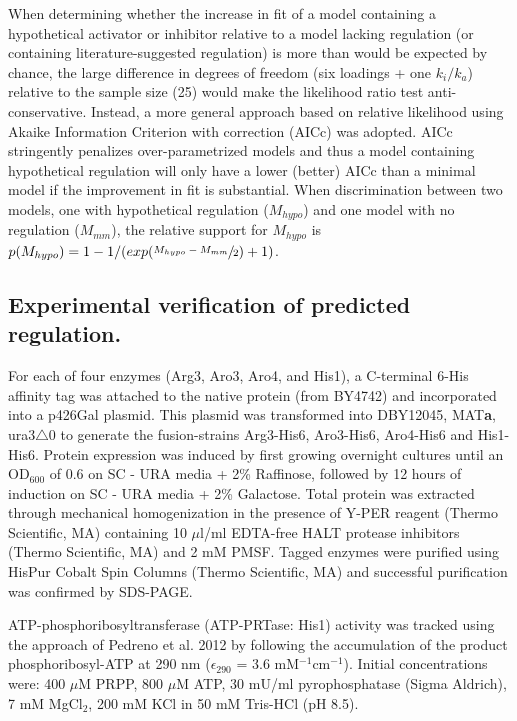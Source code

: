 \documentclass[12pt]{nature}\usepackage{graphicx, color}
\begin{document}
When determining whether the increase in fit of a model containing a hypothetical activator or inhibitor relative to a model lacking regulation (or containing literature-suggested regulation) is more than would be expected by chance, the large difference in degrees of freedom (six loadings + one $k_{i}/k_{a}$) relative to the sample size (25) would make the likelihood ratio test anti-conservative.  Instead, a more general approach based on relative likelihood using Akaike Information Criterion with correction (AICc) was adopted.  AICc stringently penalizes over-parametrized models and thus a model containing hypothetical regulation will only have a lower (better) AICc than a minimal model if the improvement in fit is substantial.  When discrimination between two models, one with hypothetical regulation ($M_{hypo}$) and one model with no regulation ($M_{mm}$), the relative support for $M_{hypo}$ is $p(M_{hypo}) = 1 - 1/(exp(\sfrac{M_{hypo} - M_{mm}}{2}) + 1)$.

\subsection{Experimental verification of predicted regulation.}

For each of four enzymes (Arg3, Aro3, Aro4, and His1), a C-terminal 6-His affinity tag was attached to the native protein (from BY4742) and incorporated into a p426Gal plasmid.  This plasmid was transformed into DBY12045, MAT\textbf{a}, ura3$\bigtriangleup$0 to generate the fusion-strains Arg3-His6, Aro3-His6, Aro4-His6 and His1-His6.  Protein expression was induced by first growing overnight cultures until an OD$_{600}$ of 0.6 on SC - URA media + 2\% Raffinose, followed by 12 hours of induction on SC - URA media + 2\% Galactose.  Total protein was extracted through mechanical homogenization in the presence of Y-PER reagent (Thermo Scientific, MA) containing 10 $\mu$l/ml EDTA-free HALT protease inhibitors (Thermo Scientific, MA) and 2 mM PMSF.  Tagged enzymes were purified using HisPur Cobalt Spin Columns (Thermo Scientific, MA) and successful purification was confirmed by SDS-PAGE.

ATP-phosphoribosyltransferase (ATP-PRTase: His1) activity was tracked using the approach of Pedreno et al. 2012 \cite{Pedreno:2012hv} by following the accumulation of the product phosphoribosyl-ATP at 290 nm ($\epsilon_{290}$ = 3.6 mM$^{-1}$cm$^{-1}$).  Initial concentrations were: 400 $\mu$M PRPP, 800 $\mu$M ATP, 30 mU/ml pyrophosphatase (Sigma Aldrich), 7 mM MgCl$_{2}$, 200 mM KCl in 50 mM Tris-HCl (pH 8.5).
\end{document}
